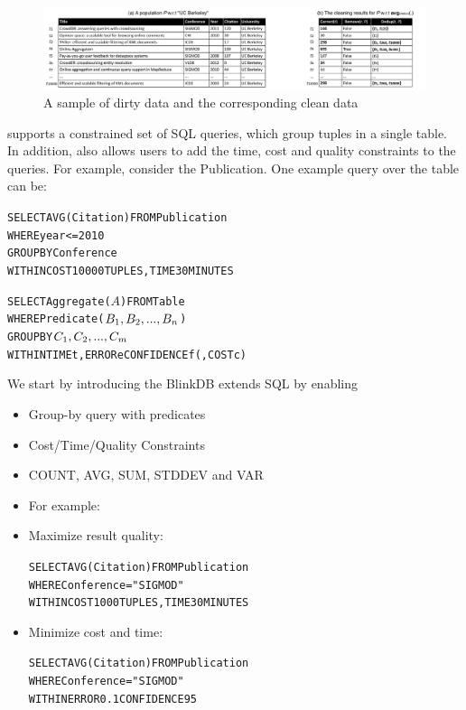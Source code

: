 \begin{figure}[htup]
\includegraphics[scale=0.38]{figs/example.pdf}
\caption{A sample of dirty data and the corresponding clean data}
\label{fig:arch}
\end{figure}
\begin{example}

\end{example}
\fi
\iffalse
\projx supports a constrained set of SQL \groupby queries, which group tuples in a single table. In addition, \projx also allows users to add the time, cost and quality constraints to the queries. For example, consider the Publication. One example query over the table can be:  
\begin{alltt}
SELECT \textsf{AVG}(Citation) FROM Publication
WHERE year <= 2010
GROUP BY Conference
WITHIN COST 10000 TUPLES, TIME 30 MINUTES
\end{alltt}

    

\begin{alltt}
SELECT Aggregate(\(A\)) FROM Table
WHERE Predicate(\(B\sb{1},B\sb{2},...,B\sb{n}\))
GROUP BY \(C\sb{1},C\sb{2},...,C\sb{m}\)
WITHIN TIME t, ERROR e CONFIDENCE f (, COST c)
\end{alltt}



We start by introducing the BlinkDB extends SQL by enabling 
\begin{itemize}
  \item Group-by query with predicates
  \item Cost/Time/Quality Constraints
  \item \textsf{COUNT}, \textsf{AVG}, \textsf{SUM}, \textsf{STDDEV} and \textsf{VAR}
  \item For example:

  \item Maximize result quality:
  \begin{alltt}
SELECT \textsf{AVG}(Citation) FROM Publication
WHERE Conference = "\textsf{SIGMOD}"
WITHIN COST 1000 TUPLES, TIME 30 MINUTES
\end{alltt}
  \item Minimize cost and time:
  \begin{alltt}
SELECT \textsf{AVG}(Citation) FROM Publication
WHERE Conference = "\textsf{SIGMOD}"
WITHIN ERROR 0.1 CONFIDENCE 95%
\end{alltt}

\end{itemize}

